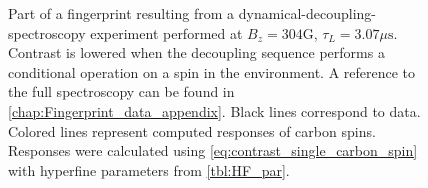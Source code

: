 \begin{figure}[htbp]
\begin{subfigure}[t]{\textwidth}
    \caption{}
    \label{fig:FP32}
    \end{subfigure}
    \caption{Part of a fingerprint resulting from a dynamical-decoupling-spectroscopy experiment performed at $B_z = 304\mathrm{G}$, $\tau_L =3.07 \mu \mathrm{s} $. Contrast is lowered when the decoupling sequence performs a conditional operation on a spin in the environment.  A reference to the full spectroscopy can be found in \cref{chap:Fingerprint_data_appendix}.  Black lines correspond to data. Colored lines represent computed responses of carbon spins. Responses were calculated using \cref{eq:contrast_single_carbon_spin} with hyperfine parameters from \cref{tbl:HF_par}. }
    \label{fig:FP}
\end{figure}




